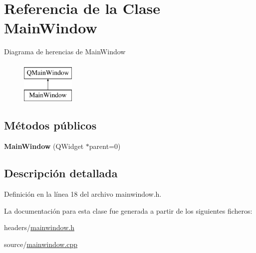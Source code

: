 \hypertarget{classMainWindow}{\section{Referencia de la Clase Main\-Window}
\label{classMainWindow}
}
Diagrama de herencias de Main\-Window\begin{figure}[H]
\begin{center}
\leavevmode
\includegraphics[height=2.000000cm]{classMainWindow}
\end{center}
\end{figure}
\subsection*{Métodos públicos}
\begin{DoxyCompactItemize}
\item 
\hypertarget{classMainWindow_a8b244be8b7b7db1b08de2a2acb9409db}{{\bfseries Main\-Window} (Q\-Widget $\ast$parent=0)}\label{classMainWindow_a8b244be8b7b7db1b08de2a2acb9409db}

\end{DoxyCompactItemize}


\subsection{Descripción detallada}


Definición en la línea 18 del archivo mainwindow.\-h.



La documentación para esta clase fue generada a partir de los siguientes ficheros\-:\begin{DoxyCompactItemize}
\item 
headers/\hyperlink{mainwindow_8h}{mainwindow.\-h}\item 
source/\hyperlink{mainwindow_8cpp}{mainwindow.\-cpp}\end{DoxyCompactItemize}
